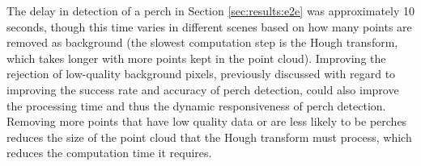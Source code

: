The delay in detection of a perch in Section \ref{sec:results:e2e} was approximately 10 seconds, though 
this time varies in different scenes based on how many points are removed as background (the slowest computation 
step is the Hough transform, which takes longer with more points kept in the point cloud). Improving the rejection 
of low-quality background pixels, previously discussed with regard to improving the success rate and accuracy of perch 
detection, could also improve the processing time and thus the dynamic responsiveness of perch detection. Removing more 
points that have low quality data or are less likely to be perches reduces the size of the point cloud that the Hough 
transform must process, which reduces the computation time it requires.